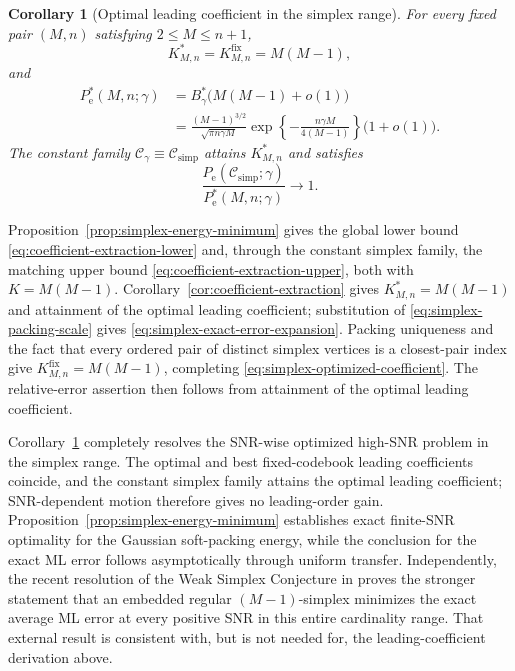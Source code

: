 \documentclass[12pt,draftclsnofoot,onecolumn]{IEEEtran}
\newcommand{\cC}{\mathcal{C}}
\newcommand{\Pe}{P_{\mathrm e}}
\newtheorem{corollary}{Corollary}
\theoremstyle{definition}
\begin{document}
\begin{corollary}[Optimal leading coefficient in the simplex range]
\label{cor:simplex-coefficient}
For every fixed pair \((M,n)\) satisfying \(2\leq M\leq n+1\),
\begin{equation}
  K^{\ast}_{M,n}
  =K^{\mathrm{fix}}_{M,n}
  =M(M-1),
  \label{eq:simplex-optimized-coefficient}
\end{equation}
and
\begin{equation}
\begin{split}
  \Pe^{\ast}(M,n;\gamma)
  &=B_\gamma^{\ast}\bigl(M(M-1)+o(1)\bigr)\\
  &=\frac{(M-1)^{3/2}}
  {\sqrt{\pi n\gamma M}}
  \exp\left\{-\frac{n\gamma M}{4(M-1)}\right\}
  \bigl(1+o(1)\bigr).
\end{split}
  \label{eq:simplex-exact-error-expansion}
\end{equation}
The constant family \(\cC_\gamma\equiv\cC_{\mathrm{simp}}\) attains
\(K^{\ast}_{M,n}\) and satisfies
\begin{equation}
  \frac{\Pe(\cC_{\mathrm{simp}};\gamma)}
  {\Pe^{\ast}(M,n;\gamma)}
  \longrightarrow1.
  \label{eq:simplex-coefficient}
\end{equation}
\end{corollary}

\begin{IEEEproof}
Proposition~\ref{prop:simplex-energy-minimum} gives the global lower
bound \eqref{eq:coefficient-extraction-lower} and, through the constant
simplex family, the matching upper bound
\eqref{eq:coefficient-extraction-upper}, both with
\(K=M(M-1)\).  Corollary~\ref{cor:coefficient-extraction} gives
\(K^{\ast}_{M,n}=M(M-1)\) and attainment of the optimal leading coefficient;
substitution of \eqref{eq:simplex-packing-scale} gives
\eqref{eq:simplex-exact-error-expansion}.  Packing uniqueness and the
fact that every ordered pair of distinct simplex vertices is a
closest-pair index give
\(K^{\mathrm{fix}}_{M,n}=M(M-1)\), completing
\eqref{eq:simplex-optimized-coefficient}.  The relative-error assertion
then follows from attainment of the optimal leading coefficient.
\end{IEEEproof}

Corollary~\ref{cor:simplex-coefficient} completely resolves the
SNR-wise optimized high-SNR problem in the simplex range.  The optimal
and best fixed-codebook leading coefficients coincide, and the constant
simplex family attains the optimal leading coefficient; SNR-dependent motion therefore gives no
leading-order gain.  Proposition~\ref{prop:simplex-energy-minimum}
establishes exact finite-SNR optimality for the Gaussian soft-packing energy, while the
conclusion for the exact ML error follows asymptotically through uniform
transfer.  Independently, the recent resolution of the Weak
Simplex Conjecture in \cite[Cors.~2.5--2.6]{Mulgund2026WeakSimplex} proves the stronger statement that an embedded regular
\((M-1)\)-simplex minimizes the exact average ML error at every positive
SNR in this entire cardinality range.
That external result is consistent with, but is not needed for, the
leading-coefficient derivation above.
\end{document}
